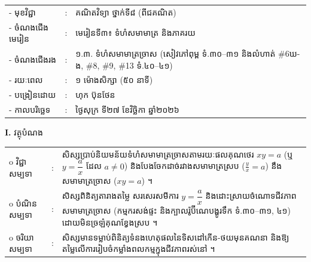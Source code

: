 \documentclass[a4paper,10pt]{article}
\newcommand{\wcirc}{{\CourierBullet\fontsize{9.5pt}{11pt}\selectfont o}}
\begin{document}
{\renewcommand{\arraystretch}{0.98}
\hspace*{3.1cm}%
\begin{tabular}{@{}l l L{11.0cm}@{}}
  - \hspace{0.35cm} មុខវិជ្ជា & : & គណិតវិទ្យា ថ្នាក់ទី៨ (ពីជគណិត) \\
  - \hspace{0.35cm} ចំណងជើងមេរៀន & : & មេរៀនទី៣៖ ទំហំសមាមាត្រ និងភាគរយ \\
  - \hspace{0.35cm} ចំណងជើងរង & : & ១.៣. ទំហំសមាមាត្រច្រាស (សៀវភៅពុម្ព ទំ.៣០–៣១ និងលំហាត់ \#6ឃ-ង, \#8, \#9, \#13 ទំ.៤០–៤១) \\
  - \hspace{0.35cm} រយៈពេល & : & ១ ម៉ោងសិក្សា (៥០ នាទី) \\
  - \hspace{0.35cm} បង្រៀនដោយ & : & ហុក ប៊ុនថែន \\
  - \hspace{0.35cm} កាលបរិច្ឆេទ & : & ថ្ងៃសុក្រ ទី២៧ ខែវិច្ឆិកា ឆ្នាំ២០២៦ \\
\end{tabular}

\vspace{2pt}

\textbf{I.} {\muol វត្ថុបំណង}\\[1pt]
\hspace*{0.55cm}%
\begin{tabular}{@{}l l L{14.2cm}@{}}
  \wcirc \hspace{0.25cm} វិជ្ជាសម្បទា & : & សិស្សប្រាប់និយមន័យទំហំសមាមាត្រច្រាសតាមរយៈផលគុណថេរ $xy = a$ (ឬ $y = \dfrac{a}{x}$ ដែល $a\neq 0$) និងបែងចែកដាច់រវាងសមាមាត្រស្រប ($\frac{y}{x}=a$) នឹងសមាមាត្រច្រាស ($xy=a$) ។ \\
  \wcirc \hspace{0.25cm} បំណិនសម្បទា & : & សិស្សពិនិត្យតារាងតម្លៃ សរសេរសមីការ $y=\dfrac{a}{x}$ និងដោះស្រាយចំណោទជីវភាពសមាមាត្រច្រាស (កម្មករសង់ផ្ទះ និងក្បាលរ៉ូប៊ីណេបង្ហូរទឹក ទំ.៣០–៣១, ៤១) ដោយមិនច្រឡំគុណខ្វែងស្រប ។ \\
  \wcirc \hspace{0.25cm} ចរិយាសម្បទា & : & សិស្សមានទម្លាប់ពិនិត្យទំនងហេតុផលនៃទិសដៅកើន-ថយមុនគណនា និងឱ្យតម្លៃលើការរៀបចំកម្លាំងពលកម្មក្នុងជីវភាពរស់នៅ ។ \\
\end{tabular}

\vspace{2pt}

}
\end{document}
